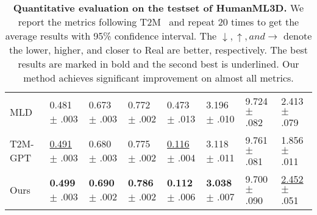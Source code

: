 \documentclass[10pt,twocolumn,letterpaper]{article}
\begin{document}
\begin{table*}[ht]
\begin{center}
\begin{tabular}{p{2.15cm}p{1.70cm}p{1.70cm}p{1.70cm}p{1.70cm}p{1.70cm}p{1.70cm}p{1.70cm}}
MLD~\cite{chen2023mld} & 0.481 \scriptsize $\pm$ .003& 0.673 \scriptsize $\pm$ .003& 0.772  \scriptsize $\pm$ .002& 0.473  \scriptsize $\pm$ .013&3.196  \scriptsize $\pm$ .010 &9.724 \scriptsize $\pm$ .082 &2.413 \scriptsize $\pm$ .079\\ 

T2M-GPT~\cite{zhang2023t2m} & \underline{0.491} \scriptsize $\pm$ .003& 0.680  \scriptsize $\pm$ .003& 0.775  \scriptsize $\pm$ .002& \underline{0.116}  \scriptsize $\pm$ .004&3.118  \scriptsize $\pm$ .011 &9.761 \scriptsize $\pm$ .081 &1.856 \scriptsize $\pm$ .011\\

\hline

Ours & \textbf{0.499} \scriptsize $\pm$ .003& \textbf{0.690}  \scriptsize $\pm$ .002& \textbf{0.786}  \scriptsize $\pm$ .002& \textbf{0.112}  \scriptsize $\pm$ .006&\textbf{3.038}  \scriptsize $\pm$ .007 &9.700 \scriptsize $\pm$ .090 &\underline{2.452} \scriptsize $\pm$ .051\\
\hline
\end{tabular}
\end{center}
\caption{\textbf{Quantitative evaluation on the testset of HumanML3D.} We report the metrics following T2M~\cite{guo2022generating} and repeat 20 times to get the average results with 95\% confidence interval. The $\downarrow, \uparrow, and \rightarrow$ denote the lower, higher, and closer to Real are better, respectively. The best results are marked in bold and the second best is underlined. Our method achieves significant improvement on almost all metrics.}
\label{table:01}
\end{table*}
\end{document}
